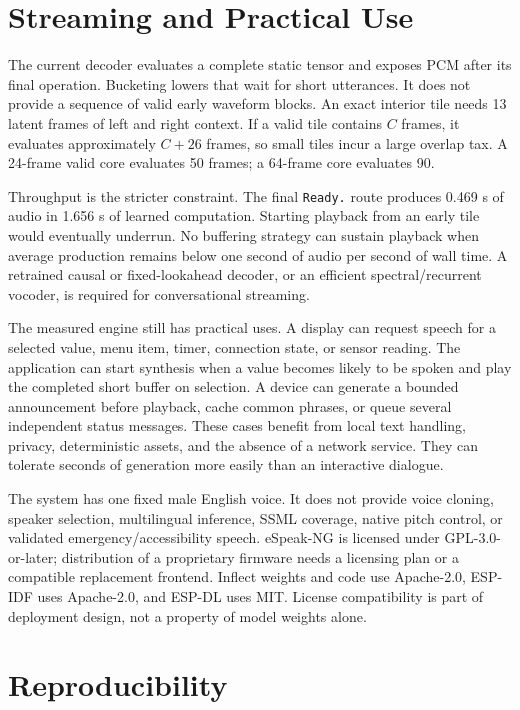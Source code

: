 \documentclass[10pt]{article}
\begin{document}
\section{Streaming and Practical Use}

The current decoder evaluates a complete static tensor and exposes PCM after
its final operation. Bucketing lowers that wait for short utterances. It does
not provide a sequence of valid early waveform blocks. An exact interior tile
needs 13 latent frames of left and right context. If a valid tile contains
$C$ frames, it evaluates approximately $C+26$ frames, so small tiles incur a
large overlap tax. A 24-frame valid core evaluates 50 frames; a 64-frame core
evaluates 90.

Throughput is the stricter constraint. The final \texttt{Ready.} route produces
0.469 s of audio in 1.656 s of learned computation. Starting playback from an
early tile would eventually underrun. No buffering strategy can sustain
playback when average production remains below one second of audio per second
of wall time. A retrained causal or fixed-lookahead decoder, or an efficient
spectral/recurrent vocoder, is required for conversational streaming.

The measured engine still has practical uses. A display can request speech for
a selected value, menu item, timer, connection state, or sensor reading. The
application can start synthesis when a value becomes likely to be spoken and
play the completed short buffer on selection. A device can generate a bounded
announcement before playback, cache common phrases, or queue several
independent status messages. These cases benefit from local text handling,
privacy, deterministic assets, and the absence of a network service. They can
tolerate seconds of generation more easily than an interactive dialogue.

The system has one fixed male English voice. It does not provide voice
cloning, speaker selection, multilingual inference, SSML coverage, native
pitch control, or validated emergency/accessibility speech. eSpeak-NG is
licensed under GPL-3.0-or-later; distribution of a proprietary firmware needs
a licensing plan or a compatible replacement frontend. Inflect weights and
code use Apache-2.0, ESP-IDF uses Apache-2.0, and ESP-DL uses MIT. License
compatibility is part of deployment design, not a property of model weights
alone.

\section{Reproducibility}
\end{document}
